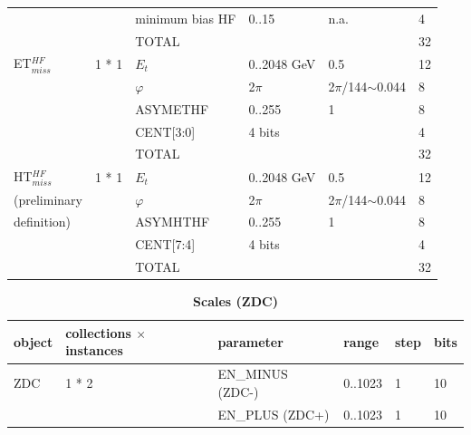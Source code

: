 \documentclass{cmspaper}
\begin{document}
\begin{table}[ht]
\begin{tabular}{| l | l | l | l | l | l |}
    &       &   minimum bias HF &      0..15    &   n.a.    &   4                    \\
    &       &   TOTAL   &       &       &   32                    \\
\hline
ET$_{miss}^{HF}$	&	1 * 1	&   $E_t$   &   0..2048 GeV &   0.5 &   12                    \\
	&		&   $\varphi$   &   2$\pi$  &   2$\pi$/144$\sim$0.044   &   8                    \\
    &       &   ASYMETHF    &  0..255     &    1   &   8                    \\
    &       &   CENT[3:0]    &  4 bits    &       &   4                    \\
	&		&	TOTAL	&		&		&	32                    \\
\hline
HT$_{miss}^{HF}$	&	1 * 1	&   $E_t$   &   0..2048 GeV &   0.5 &   12                    \\
(preliminary	&		&   $\varphi$   &   2$\pi$  &   2$\pi$/144$\sim$0.044   &   8                    \\
definition)	&		&	ASYMHTHF	&	0..255 &	1 &	8                    \\
    &       &   CENT[7:4]    & 4 bits     &       &   4                    \\
	&		&	TOTAL	&		&		&	32                    \\
\hline
\end{tabular}
\label{table:scales_table_2}
\end{table}

\begin{table}[ht]
\caption{\bf Scales (ZDC)}
\vspace{5mm}
\centering
\begin{tabular}{|p{2.0cm}| l | p{2.0cm} | p{2.0cm} | p{2.0cm} | l |}
\hline
object	&	collections $\times$ instances	&	parameter	&	range	&	step	&	bits \\
\hline\hline
ZDC	       &	1 * 2	& EN\_MINUS (ZDC-)	    &	0..1023	   &	1	  &	10  \\
           &	        & EN\_PLUS (ZDC+)	    &	0..1023	   &	1	  &	10  \\
\hline
\end{tabular}
\label{table:scales_table_3}
\end{table}
\end{document}
